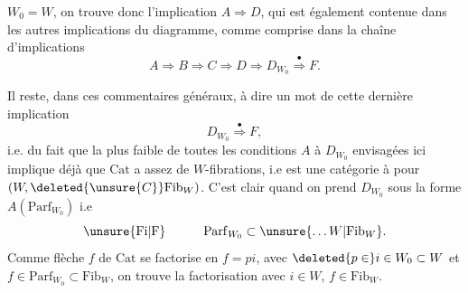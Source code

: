 
$W_0=W$, on trouve donc l'implication $A\Longrightarrow D$, qui est  également contenue dans les autres implications du diagramme, comme comprise dans la chaîne d'implications
\[
 A\Longrightarrow B\Longrightarrow C\Longrightarrow D\Longrightarrow D_{W_0}
 \overset{\bullet}{\Longrightarrow}F.
\]

Il reste, dans ces commentaires généraux, à dire un mot de cette dernière implication
\[
 D_{W_0}\overset{\bullet}{\Longrightarrow}F,
\]
i.e. du fait que la plus faible de toutes les  conditions  $A$ à $D_{W_0}$ envisagées ici  implique déjà que $\mathrm{Cat}$ a assez de $W$-fibrations, i.e est une catégorie à  pour $(W,\deleted{\unsure{C}}\mathrm{Fib}_{W})$. C'est clair quand on prend $D_{W_0}$ sous la forme $A(\mathrm{Parf}_{W_0})$ i.e
\[
 \unsure{\mathrm{Fi}|\mathrm{F}}\hspace{3em}\mathrm{Parf}_{W_0}\subset\unsure{\ldots W|\mathrm{Fib}_{W}}.
\]
Comme  flèche $f$ de $\mathrm{Cat}$ se factorise en $f=pi$, avec $\deleted{p\in}i\in W_0\subset W$ et $f\in\mathrm{Parf}_{W_0}\subset\mathrm{Fib}_{W}$, on trouve la factorisation avec $i\in W$, $f\in\mathrm{Fib}_{W}$.
